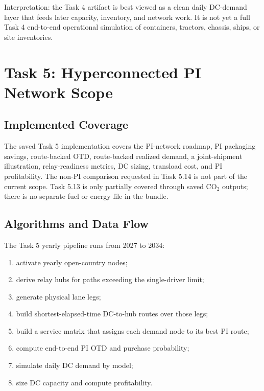 \documentclass[11pt]{article}
\begin{document}
Interpretation: the Task 4 artifact is best viewed as a clean daily DC-demand layer that feeds
later capacity, inventory, and network work. It is not yet a full Task 4 end-to-end operational
simulation of containers, tractors, chassis, ships, or site inventories.

\section{Task 5: Hyperconnected PI Network Scope}

\subsection{Implemented Coverage}

The saved Task 5 implementation covers the PI-network roadmap, PI packaging savings, route-backed
OTD, route-backed realized demand, a joint-shipment illustration, relay-readiness metrics, DC
sizing, transload cost, and PI profitability. The non-PI comparison requested in Task 5.14 is
not part of the current scope. Task 5.13 is only partially covered through saved CO$_2$ outputs;
there is no separate fuel or energy file in the bundle.

\subsection{Algorithms and Data Flow}

The Task 5 yearly pipeline runs from 2027 to 2034:
\begin{enumerate}
  \item activate yearly open-country nodes;
  \item derive relay hubs for paths exceeding the single-driver limit;
  \item generate physical lane legs;
  \item build shortest-elapsed-time DC-to-hub routes over those legs;
  \item build a service matrix that assigns each demand node to its best PI route;
  \item compute end-to-end PI OTD and purchase probability;
  \item simulate daily DC demand by model;
  \item size DC capacity and compute profitability.
\end{enumerate}
\end{document}
